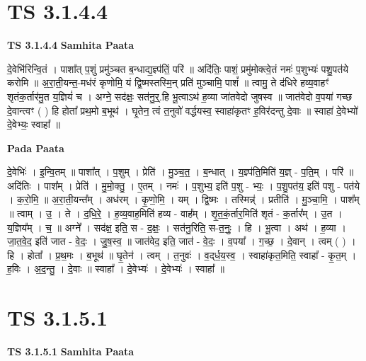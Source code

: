 \documentclass[17pt]{extarticle}
\begin{document}

\section{ TS 3.1.4.4 }

\textbf{TS 3.1.4.4 } \newline
\textbf{Samhita Paata} \newline

दे॒वेभि॑रिन्वि॒तं । पाशा᳚त् प॒शुं प्रमु॑ञ्चत ब॒न्धाद्य॒ज्ञ्प॑तिं॒ परि॑ ॥ अदि॑तिः॒ पाशं॒ प्रमु॑मोक्त्वे॒तं नमः॑ प॒शुभ्यः॑ पशु॒पत॑ये करोमि ॥ अ॒रा॒ती॒यन्त॒-मध॑रं कृणोमि॒ यं द्वि॒ष्मस्तस्मि॒न् प्रति॑ मुञ्चामि॒ पाशं᳚ ॥ त्वामु॒ ते द॑धिरे हव्य॒वाहꣳ॑ शृतंक॒र्तार॑मु॒त य॒ज्ञियं॑ च । अग्ने॒ सद॑क्षः॒ सत॑नु॒र्॒.हि भू॒त्वाऽथ॑ ह॒व्या जा॑तवेदो जुषस्व ॥ जात॑वेदो व॒पया॑ गच्छ दे॒वान्त्वꣳ ( ) हि होता᳚ प्रथ॒मो ब॒भूथ॑ । घृ॒तेन॒ त्वं त॒नुवो॑ वर्द्धयस्व॒ स्वाहा॑कृतꣳ ह॒विर॑दन्तु दे॒वाः ॥ स्वाहा॑ दे॒वेभ्यो॑ दे॒वेभ्यः॒ स्वाहा᳚ ॥ \newline

\textbf{Pada Paata} \newline

दे॒वेभिः॑ । इ॒न्वि॒तम् ॥ पाशा᳚त् । प॒शुम् । प्रेति॑ । मु॒ञ्च॒त॒ । ब॒न्धात् । य॒ज्ञ्प॑ति॒मिति॑ य॒ज्ञ् - प॒ति॒म् । परि॑ ॥ अदि॑तिः । पाश᳚म् । प्रेति॑ । मु॒मो॒क्तु॒ । ए॒तम् । नमः॑ । प॒शुभ्य॒ इति॑ प॒शु - भ्यः॒ । प॒शु॒पत॑य॒ इति॑ पशु - पत॑ये । क॒रो॒मि॒ ॥ अ॒रा॒ती॒यन्त᳚म् । अध॑रम् । कृ॒णो॒मि॒ । यम् । द्वि॒ष्मः । तस्मिन्न्॑ । प्रतीति॑ । मु॒ञ्चा॒मि॒ । पाश᳚म् ॥ त्वाम् । उ॒ । ते । द॒धि॒रे॒ । ह॒व्य॒वाह॒मिति॑ हव्य - वाह᳚म् । शृ॒त॒कं॒र्तार॒मिति॑ शृतं - क॒र्तार᳚म् । उ॒त । य॒ज्ञिय᳚म् । च॒ ॥ अग्ने᳚ । सद॑क्ष॒ इति॒ स - द॒क्षः॒ । सत॑नु॒रिति॒ स-त॒नुः॒ । हि । भू॒त्वा । अथ॑ । ह॒व्या । जा॒त॒वे॒द॒ इति॑ जात - वे॒दः॒ । जु॒ष॒स्व॒ ॥ जात॑वेद॒ इति॒ जात॑ - वे॒दः॒ । व॒पया᳚ । ग॒च्छ॒ । दे॒वान् । त्वम् ( ) । हि । होता᳚ । प्र॒थ॒मः । ब॒भूथ॑ ॥ घृ॒तेन॑ । त्वम् । त॒नुवः॑ । व॒द्‌र्ध॒य॒स्व॒ । स्वाहा॑कृत॒मिति॒ स्वाहा᳚ - कृ॒त॒म् । ह॒विः । अ॒द॒न्तु॒ । दे॒वाः ॥ स्वाहा᳚ । दे॒वेभ्यः॑ । दे॒वेभ्यः॑ । स्वाहा᳚ ॥  \newline





\section{ TS 3.1.5.1 }

\textbf{TS 3.1.5.1 } \newline
\textbf{Samhita Paata} \newline
\end{document}
